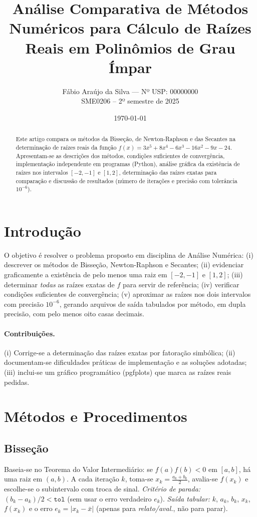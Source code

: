 \documentclass[12pt,a4paper]{article}
\title{Análise Comparativa de Métodos Numéricos para Cálculo de Raízes Reais em Polinômios de Grau Ímpar}
\author{
  Fábio Araújo da Silva --- Nº USP: 00000000 \\[3pt]
  \normalsize SME0206 -- 2º semestre de 2025
}
\date{\today}
\begin{document}
\maketitle

\begin{abstract}
Este artigo compara os métodos da Bisseção, de Newton-Raphson e das Secantes na determinação de raízes reais da função
$f(x)=3x^{5}+8x^{4}-6x^{3}-16x^{2}-9x-24$.
Apresentam-se as descrições dos métodos, condições suficientes de convergência, implementação independente em programas (Python),
análise gráfica da existência de raízes nos intervalos $[-2,-1]$ e $[1,2]$, determinação das raízes exatas para comparação e
discussão de resultados (número de iterações e precisão com tolerância $10^{-6}$).
\end{abstract}

\section{Introdução}
O objetivo é resolver o problema proposto em disciplina de Análise Numérica:
(i) descrever os métodos de Bisseção, Newton-Raphson e Secantes; (ii) evidenciar graficamente a existência de pelo menos uma raiz em
$[-2,-1]$ e $[1,2]$; (iii) determinar \emph{todas} as raízes exatas de $f$ para servir de referência;
(iv) verificar condições suficientes de convergência; (v) aproximar as raízes nos dois intervalos com precisão $10^{-6}$,
gerando arquivos de saída tabulados por método, em dupla precisão, com pelo menos oito casas decimais.

\paragraph{Contribuições.}
(i) Corrige-se a determinação das raízes exatas por fatoração simbólica; (ii) documentam-se dificuldades práticas de implementação
e as soluções adotadas; (iii) inclui-se um gráfico programático (pgfplots) que marca as raízes reais pedidas.

\section{Métodos e Procedimentos}
\subsection{Bisseção}
Baseia-se no Teorema do Valor Intermediário: se $f(a)f(b)<0$ em $[a,b]$, há uma raiz em $(a,b)$.
A cada iteração $k$, toma-se $x_k=\tfrac{a_k+b_k}{2}$, avalia-se $f(x_k)$ e escolhe-se o subintervalo com troca de sinal.
\emph{Critério de parada:} $(b_k-a_k)/2<\texttt{tol}$ (sem usar o erro verdadeiro $e_k$).
\emph{Saída tabular:} $k$, $a_k$, $b_k$, $x_k$, $f(x_k)$ e o erro $e_k=|x_k-\bar{x}|$ (apenas para \emph{relato/aval.}, não para parar).
\end{document}
